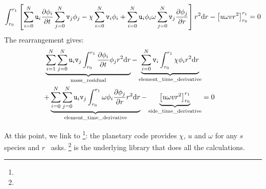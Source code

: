 \begin{equation}
 \int_{r_0}^{r_1}\left[
                  \sum_{i=0}^{N}\mathtt{u}_i\frac{\partial\phi_i}{\partial t} \sum_{j=0}^{N}\mathtt{v}_j \phi_j
                 - \chi \sum_{i=0}^{N}\mathtt{v}_i\phi_i 
                 + \sum_{i=0}^{N}\mathtt{u}_i\phi_i\omega\sum_{j=0}^{N}\mathtt{v}_j\frac{\partial\phi_j}{\partial r}\right]r^2\mathrm{d} r
 - \left[u\omega v r^2\right]_{r_0}^{r_1} = 0
\end{equation}
The rearrangement gives:
\begin{equation}
\begin{split}
  \underbrace{\sum_{i=1}^{N}\sum_{j=0}^{N}\mathtt{u}_i\mathtt{v}_j\int_{r_0}^{r_1}\frac{\partial\phi_i}{\partial t}\phi_jr^2\mathrm{d} r}_\text{mass\_residual}
- \underbrace{\sum_{i=0}^{N}\mathtt{v}_i\int_{r_0}^{r_1}\chi\phi_i r^2\mathrm{d} r}_\text{element\_time\_derivative} \\
+ \underbrace{\sum_{i=0}^{N}\sum_{j=0}^{N}\mathtt{u}_i\mathtt{v}_j\int_{r_0}^{r_1}\omega\phi_i\frac{\partial\phi_j}{\partial r}r^2\mathrm{d} r}_\text{element\_time\_derivative}
 - \underbrace{\left[u\omega v r^2\right]_{r_0}^{r_1}}_\text{side\_time\_derivative}  & = 0
\end{split}
\end{equation}


At this point, we link to \GRINS\footnote{\GitGrins}: the planetary code provides $\chi$, $u$ and
$\omega$ for any $s$ species and $r$ \GRINS\ asks. \LibMesh\footnote{\GitLibmesh} is the underlying library that
does all the calculations.
